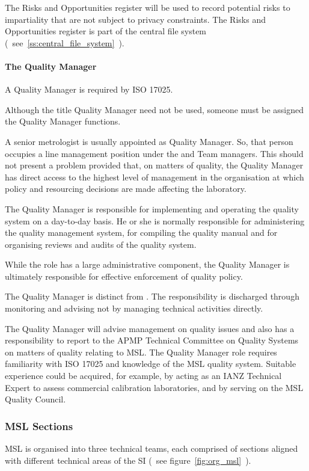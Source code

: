 The Risks and Opportunities register will be used to record potential risks to impartiality that are not subject to privacy constraints. The Risks and Opportunities register is part of the central file system (~see~\ref{ss:central_file_system}~).

\paragraph{The Quality Manager}
A Quality Manager is required by ISO 17025. 

Although the title Quality Manager need not be used, someone must be 
assigned the Quality Manager functions. 

A senior metrologist is usually appointed as Quality Manager. So, that person occupies a line management position under the  and Team managers. This should not present a problem provided that, on matters of quality, the Quality Manager has direct access to the highest level of management in the organisation at which policy and resourcing decisions are made affecting the 
laboratory.

The Quality Manager is responsible for implementing and operating the quality system on a day-to-day basis. He or she is normally responsible for administering the quality management system, for compiling the quality manual and for organising reviews and audits of the quality system.

While the role has a large administrative component, the Quality Manager is ultimately responsible for effective enforcement of quality policy. 

The Quality Manager is distinct from . The responsibility is discharged through monitoring and advising not by managing technical activities directly.

The Quality Manager will advise management on quality issues and also has a responsibility to report to the APMP Technical Committee on Quality Systems on matters of quality relating to MSL.
The Quality Manager role requires familiarity with ISO 17025 and knowledge of the MSL quality system. Suitable experience could be acquired, for example, by acting as an IANZ Technical Expert to assess commercial calibration laboratories, and by serving on the MSL Quality Council.

\subsubsection{MSL Sections}
MSL is organised into three technical teams, each comprised of sections aligned with different technical areas of the SI (~see figure~\ref{fig:org_msl}~).

